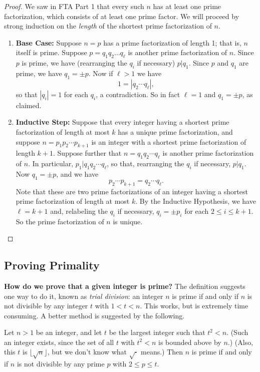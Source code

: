 \begin{proof}
We saw in FTA Part 1 that every such \(n\) has at least one prime factorization, which consists of at least one prime factor. We will proceed by strong induction on the \emph{length} of the shortest prime factorization of \(n\).
\begin{enumerate}
\item \textbf{Base Case:} Suppose \(n = p\) has a prime factorization of length 1; that is, \(n\) itself is prime. Suppose \(p = q_1q_2 \ldots q_\ell\) is another prime factorization of \(n\). Since \(p\) is prime, we have (rearranging the \(q_i\) if necessary) \(p|q_1\). Since \(p\) and \(q_1\) are prime, we have \(q_1 = \pm p\). Now if \(\ell > 1\) we have \[ 1 = |q_2 \cdots q_\ell|, \] so that \(|q_i| = 1\) for each \(q_i\), a contradiction. So in fact \(\ell = 1\) and \(q_1 = \pm p\), as claimed.
\item \textbf{Inductive Step:} Suppose that every integer having a shortest prime factorization of length at most \(k\) has a unique prime factorization, and suppose \(n = p_1p_2 \cdots p_{k+1}\) is an integer with a shortest prime factorization of length \(k+1\). Suppose further that \(n = q_1q_2 \cdots q_\ell\) is another prime factorization of \(n\). In particular, \(p_1 | q_1q_2 \cdots q_\ell\), so that, rearranging the \(q_i\) if necessary, \(p|q_1\). Now \(q_1 = \pm p\), and we have \[p_2 \cdots p_{k+1} = q_2 \cdots q_\ell. \] Note that these are two prime factorizations of an integer having a shortest prime factorization of length at most \(k\). By the Inductive Hypothesis, we have \(\ell = k+1\) and, relabeling the \(q_i\) if necessary, \(q_i = \pm p_i\) for each \(2 \leq i \leq k+1\). So the prime factorization of \(n\) is unique. \qedhere
\end{enumerate}
\end{proof}



\subsection*{Proving Primality}

\textbf{How do we prove that a given integer is prime?} The definition suggests one way to do it, known as \emph{trial division}: an integer \(n\) is prime if and only if \(n\) is not divisible by any integer \(t\) with \(1 < t < n\). This works, but is extremely time consuming. A better method is suggested by the following.

\begin{prop}
Let \(n > 1\) be an integer, and let \(t\) be the largest integer such that \(t^2 < n\). (Such an integer exists, since the set of all \(t\) with \(t^2 < n\) is bounded above by \(n\).) (Also, this \(t\) is \(\lfloor \sqrt{n} \rfloor\), but we don't know what \(\sqrt{\cdot}\) means.) Then \(n\) is prime if and only if \(n\) is not divisible by any prime \(p\) with \(2 \leq p \leq t\).
\end{prop}

